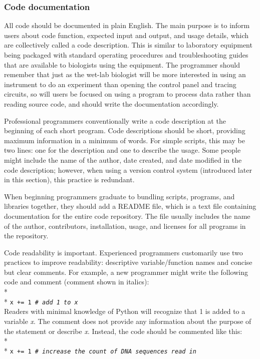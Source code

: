 \documentclass[ChapterTOCs,krantz2]{krantz} %
\begin{document}
\subsubsection{Code documentation} 
All code should be documented in plain English.  
The main purpose is to inform users about code function, expected input
and output, and usage details, which are collectively called
a code description. This is
similar to laboratory equipment being packaged with standard operating
procedures and troubleshooting guides that are available to biologists
using the equipment.  The programmer should remember that just as the
wet-lab biologist will be more interested in using an instrument to do an
experiment than opening the control panel and tracing circuits, so will users
be focused on using a program to process data rather than reading
source code, and should write the documentation accordingly. 

Professional programmers conventionally write a code description at the
beginning of each short program.  Code descriptions should be short, 
providing maximum information in a
minimum of words.  For simple scripts, this may be two lines: one for the
description and one to describe the usage.  Some people might include the
name of the author, date created, and date modified in the code description;
however, when using a version control system (introduced later in this
section), this practice is redundant.  

When beginning programmers graduate to bundling scripts, programs, and libraries together,
they should add a README file, which is a text file containing
documentation for the entire code repository. The file usually includes
the name of the author, contributors,
installation, usage, and licenses for all programs in the repository.

Code readability is important.  
Experienced programmers customarily use two practices to improve readability:
descriptive variable/function names and concise but clear comments.  
For example, a new programmer might write the following code and comment 
(comment shown in italics):\\* \\*
\texttt{x += 1  \emph{\# add 1 to x}}\\

\noindent
Readers with minimal knowledge of Python will recognize that 1 is added
to a variable \emph{x}. The comment does not provide any information about the purpose
of the statement or describe \emph{x}. Instead, the code should be commented like this:\\* \\*
\texttt{x += 1  \emph{\# increase the count of DNA sequences read in}}\\
\end{document}
